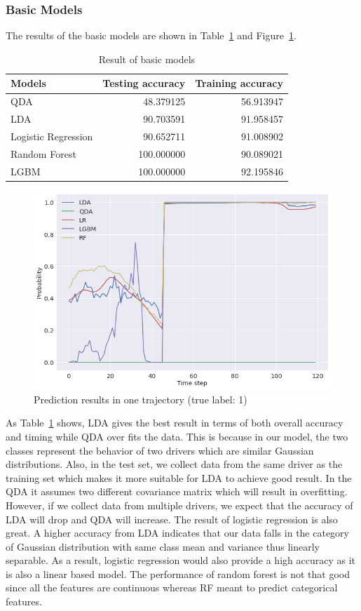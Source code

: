 \documentclass[conference]{IEEEtran}
\begin{document}
\subsubsection{Basic Models}
The results of the basic models are shown in Table~\ref{tb:QISresult} and Figure~\ref{fig:QISresult}.
\begin{table}[H]
	\caption{Result of basic models}
	\centering
	\label{tb:QISresult}
\begin{tabular}{lrr}
\hline
\textbf{Models} &           \textbf{Testing accuracy} &          \textbf{Training accuracy}\\
\hline
QDA &   48.379125 &  56.913947 \\
LDA &   90.703591 &  91.958457 \\
Logistic Regression &   90.652711 &  91.008902 \\
Random Forest &  100.000000 &  90.089021 \\
LGBM &  100.000000 &  92.195846 \\
\hline
\end{tabular}
\end{table}
\begin{figure}[H]
	\centering
	\includegraphics[scale = 0.3]{QISresult.png}
	\caption{Prediction results in one trajectory (true label: 1)}
	\label{fig:QISresult}
\end{figure}
As Table~\ref{tb:QISresult} shows, LDA gives the best result in terms of both overall accuracy and timing while QDA over fits the data. This is because in our model, the two classes represent the behavior of two drivers which are similar Gaussian distributions. Also, in the test set, we collect data from the same driver as the training set which makes it more suitable for LDA to achieve good result. In the QDA it assumes two different covariance matrix which will result in overfitting. However, if we collect data from multiple drivers, we expect that the accuracy of LDA will drop and QDA will increase. The result of logistic regression is also great. A higher accuracy from LDA indicates that our data falls in the category of Gaussian distribution with same class mean and variance thus linearly separable. As a result, logistic regression would also provide a high accuracy as it is also a linear based model. The performance of random forest is not that good since all the features are continuous whereas RF meant to predict categorical features.  
\end{document}
